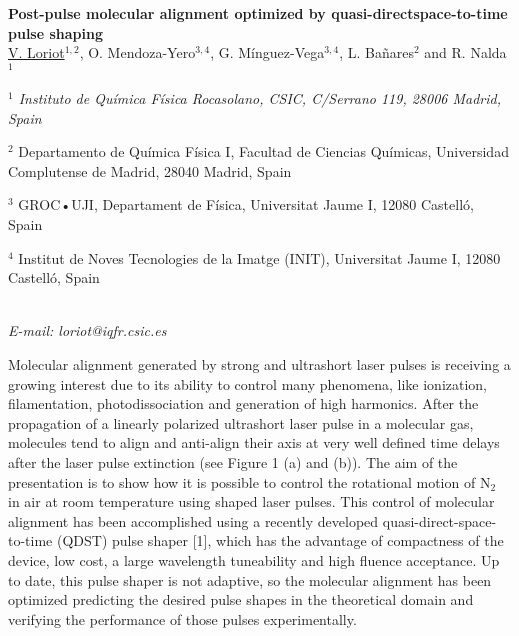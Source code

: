 \section*{}
\begin{center}
{\bf \Large
Post-pulse molecular alignment optimized by quasi-directspace-to-time pulse shaping
}
\\
\vspace{0.5cm}
\underline{V. Loriot}$^{1,2}$, O. Mendoza-Yero$^{3,4}$, G. Mínguez-Vega$^{3,4}$,
L. Bañares$^{2}$ and R. Nalda$^{1}$
\\
\vspace{0.5cm}
{\it
$^{1}$ Instituto de Química Física Rocasolano, CSIC, C/Serrano 119, 28006 Madrid, Spain

$^{2}$ Departamento de Química Física I, Facultad de Ciencias Químicas, Universidad Complutense de
Madrid, 28040 Madrid, Spain

$^{3}$ GROC•UJI, Departament de Física, Universitat Jaume I, 12080 Castelló, Spain

$^{4}$ Institut de Noves Tecnologies de la Imatge (INIT), Universitat Jaume I, 12080 Castelló, Spain
}
\\
\vspace{0.5cm}
{\it E-mail: loriot@iqfr.csic.es}
\\
\vspace{0.5cm}
\end{center}
Molecular alignment generated by strong and ultrashort laser pulses is
receiving a growing interest due to its ability to control many phenomena, like
ionization, filamentation, photodissociation and generation of high harmonics. After
the propagation of a linearly polarized ultrashort laser pulse in a molecular gas,
molecules tend to align and anti-align their axis at very well defined time delays after
the laser pulse extinction (see Figure 1 (a) and (b)). The aim of the presentation is to
show how it is possible to control the rotational motion of N$_{2}$ in air at room
temperature using shaped laser pulses. This control of molecular alignment has been
accomplished using a recently developed quasi-direct-space-to-time (QDST) pulse
shaper [1], which has the advantage of compactness of the device, low cost, a large
wavelength tuneability and high fluence acceptance. Up to date, this pulse shaper is
not adaptive, so the molecular alignment has been optimized predicting the desired
pulse shapes in the theoretical domain and verifying the performance of those pulses
experimentally.

